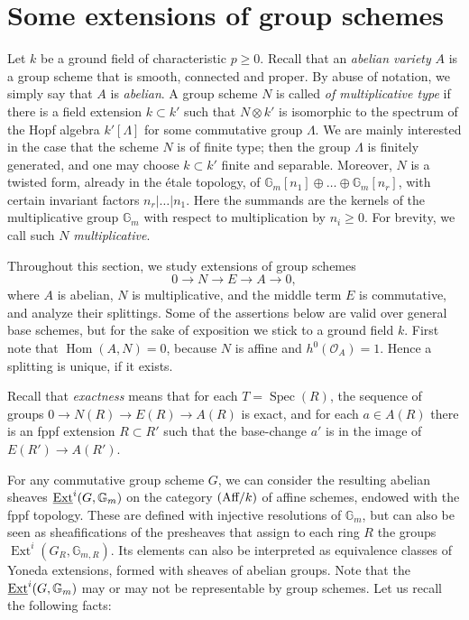 \documentclass[oneside, 12pt]{amsart}
\newcommand\mylabel[1]{\label{#1}\marginpar{\raggedright\vspace{-1ex}\medskip\medskip\footnotesize \tt #1}}
\renewcommand\mylabel[1]{\label{#1}}
\theoremstyle{definition}
\theoremstyle{remark}
\newcommand{\GG}{\mathbb{G}}
\newcommand{\Aff}{\text{\rm Aff}}
\newcommand{\Ext}{\operatorname{Ext}}
\newcommand{\Hom}{\operatorname{Hom}}
\newcommand{\lra}{\longrightarrow}
\renewcommand{\O}{\mathscr{O}}
\newcommand{\ra}{\rightarrow}
\newcommand{\Spec}{\operatorname{Spec}}
\begin{document}
\section{Some extensions of group schemes}
\mylabel{Some extensions}

Let $k$ be a ground field of characteristic $p\geq 0$. 
Recall that an \emph{abelian variety} $A$ is a group scheme that is smooth, connected and proper.
By abuse of notation, we simply say that $A$ is \emph{abelian}.
A group scheme   $N$ is called \emph{of multiplicative type} if there is a field extension $k\subset k'$
such that $N\otimes k'$ is isomorphic to the spectrum of the Hopf algebra $k'[\Lambda]$ for some
commutative group $\Lambda$. We are mainly interested in the case that the scheme $N$ is of finite type; then
the group $\Lambda$ is finitely generated, and one may choose $k\subset k'$ finite and separable.
Moreover, $N$ is a twisted form, already in the \'etale topology, of  
$\GG_m[n_1]\oplus\ldots\oplus\GG_m[n_r]$, with certain invariant factors $n_r|\ldots|n_1$.
Here the summands are the kernels of the multiplicative group $\GG_m$
with respect to multiplication by $n_i\geq 0$. For brevity, we call such $N$   \emph{multiplicative}.

Throughout this section, we study   extensions of group schemes
\begin{equation}
\label{extension}
0\lra N\lra E\lra A\lra 0,
\end{equation}
where $A$ is abelian,  $N$ is multiplicative, and the middle term $E$ is commutative, and analyze their splittings.
Some of the assertions below are valid over general base schemes, but for the sake of exposition we stick to a ground field $k$.
First note that $\Hom(A,N)=0$, because $N$ is affine and $h^0(\O_A)=1$.
Hence a splitting is unique, if it exists.

Recall that \emph{exactness} means that for each $T=\Spec(R)$,
the sequence of groups $0\ra N(R)\ra E(R)\ra A(R)$ is exact, and for each  $a\in A(R)$ there is an fppf extension $R\subset R'$
such that the base-change $a'$ is in the image of $E(R')\ra A(R')$.
 
For any commutative group scheme   $G$, we can consider the resulting 
abelian sheaves $\uExt^i(G,\GG_m)$ on the category $(\Aff/k)$ of affine schemes,
endowed with the fppf topology. These are defined with injective resolutions of $\GG_m$,
but can also be seen as sheafifications of the presheaves that assign to each ring $R$
the groups $\Ext^i(G_R,\GG_{m,R})$. Its elements  can also be interpreted as equivalence classes of Yoneda extensions,
formed with sheaves of abelian groups.
Note that the $\uExt^i(G,\GG_m)$  may or may not be representable by group schemes. Let us recall the following facts:
\end{document}
